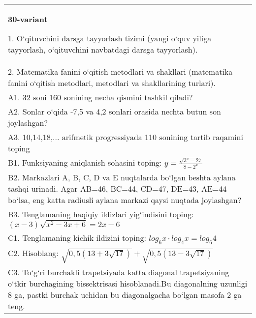 \documentclass{article}
\begin{document}
\begin{tabular}{m{17cm}}
\textbf{30-variant}

1. O‘qituvchini darsga tayyorlash tizimi (yangi o‘quv yiliga tayyorlash, o‘qituvchini navbatdagi darsga tayyorlash). \\
2. Matematika fanini o‘qitish metodlari va shakllari (matematika fanini o‘qitish metodlari, metodlari va shakllarining turlari). \\
A1. 32 soni 160 sonining necha qismini tashkil qiladi? \\
A2. Sonlar o‘qida -7,5 va 4,2 sonlari orasida nechta butun son joylashgan? \\
A3. 10,14,18,... arifmetik progressiyada 110 sonining tartib raqamini toping \\
B1. Funksiyaning aniqlanish sohasini toping: \(y = \frac{\sqrt{3^{x} - 27}}{8 - 2^{x}}\) \\
B2. Markazlari A, B, C, D va E nuqtalarda bo‘lgan beshta aylana tashqi urinadi. Agar AB=46, BC=44, CD=47, DE=43, AE=44 bo‘lsa, eng katta radiusli aylana markazi qaysi nuqtada joylashgan? \\
B3. Tenglamaning haqiqiy ildizlari yig‘indisini toping: \((x-3) \sqrt{x^{2} - 3x + 6} = 2x - 6\) \\
C1. Tenglamaning kichik ildizini toping: \(log_{6}x \cdot log_{4}x = log_{6}4\) \\
C2. Hisoblang: \(\sqrt{0,5 (13 + 3\sqrt{17}) } + \sqrt{0,5 (13 - 3\sqrt{17}) }\) \\
C3. To‘g‘ri burchakli trapetsiyada katta diagonal trapetsiyaning o‘tkir burchagining bissektrisasi hisoblanadi.Bu diagonalning uzunligi 8 ga, pastki burchak uchidan bu diagonalgacha bo‘lgan masofa 2 ga teng. \\

\end{tabular}
\vspace{1cm}
\end{document}
